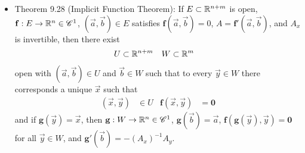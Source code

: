 \documentclass[../notes.tex]{subfiles}
\begin{document}
\begin{itemize}
\begin{proof}
\begin{equation*}
            A(\vec{h},\vec{k}) = A_x\vec{h}+A_y\vec{k}
            = \bm{0}
        \end{equation*}
        as desired.
    \end{proof}
    \item Theorem 9.28 (Implicit Function Theorem): If $E\subset\mathbb{R}^{n+m}$ is open, $\mathbf{f}:E\to\mathbb{R}^n\in\mathscr{C}^1$, $(\vec{a},\vec{b})\in E$ satisfies $\mathbf{f}(\vec{a},\vec{b})=0$, $A=\mathbf{f}'(\vec{a},\vec{b})$, and $A_x$ is invertible, then there exist
    \begin{align*}
        U &\subset \mathbb{R}^{n+m}&
        W &\subset \mathbb{R}^m
    \end{align*}
    open with $(\vec{a},\vec{b})\in U$ and $\vec{b}\in W$ such that to every $\vec{y}\in W$ there corresponds a unique $\vec{x}$ such that
    \begin{align*}
        (\vec{x},\vec{y}) &\in U&
        \mathbf{f}(\vec{x},\vec{y}) &= \bm{0}
    \end{align*}
    and if $\mathbf{g}(\vec{y})=\vec{x}$, then $\mathbf{g}:W\to\mathbb{R}^n\in\mathscr{C}^1$, $\mathbf{g}(\vec{b})=\vec{a}$, $\mathbf{f}(\mathbf{g}(\vec{y}),\vec{y})=\bm{0}$ for all $\vec{y}\in W$, and $\mathbf{g}'(\vec{b})=-(A_x)^{-1}A_y$.
\end{itemize}
\end{document}
